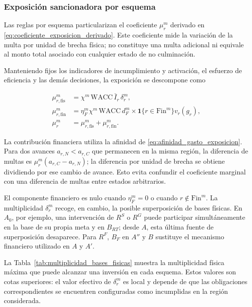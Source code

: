 \subsubsection{Exposición sancionadora por esquema}

Las reglas por esquema particularizan el coeficiente \(\mu_r^m\) derivado en \eqref{eq:coeficiente_exposicion_derivado}. Este coeficiente mide la variación de la multa por unidad de brecha física; no constituye una multa adicional ni equivale al monto total asociado con cualquier estado de no culminación.

Manteniendo fijos los indicadores de incumplimiento y activación, el esfuerzo de eficiencia y las demás decisiones, la exposición se descompone como

\begin{subequations}
\label{eq:descomposicion_exposicion_esquemas}
\begin{align}
\mu_{r,\mathrm{fis}}^m
&=\chi^m\,\mathrm{WACC}\,\bar I_r\,\delta_r^m,
\label{eq:exposicion_fisica_esquemas}\\
\mu_{r,\mathrm{fin}}^m
&=\eta_F^m\chi^m\,\mathrm{WACC}\,d_F^m\times\mathbf1\{r\in\mathrm{Fin}^m\}v_r(g_r),
\label{eq:exposicion_financiera_esquemas}\\
\mu_r^m
&=\mu_{r,\mathrm{fis}}^m+\mu_{r,\mathrm{fin}}^m.
\label{eq:exposicion_total_esquemas}
\end{align}
\end{subequations}

La contribución financiera utiliza la afinidad de \eqref{eq:afinidad_gasto_exposicion}. Para dos avances \(a_{r,N}<a_{r,C}\) que permanecen en la misma región, la diferencia de multas es \(\mu_r^m(a_{r,C}-a_{r,N})\); la diferencia por unidad de brecha se obtiene dividiendo por ese cambio de avance. Esto evita confundir el coeficiente marginal con una diferencia de multas entre estados arbitrarios.

El componente financiero es nulo cuando \(\eta_F^m=0\) o cuando \(r\notin\mathrm{Fin}^m\). La multiplicidad \(\delta_r^m\) recoge, en cambio, la posible superposición de bases físicas. En \(A_0\), por ejemplo, una intervención de \(R^{S}\) o \(R^{G}\) puede participar simultáneamente en la base de su propia meta y en \(B_{RT}\); desde \(A\), esta última fuente de superposición desaparece. Para \(R^{F}\), \(B_F\) en \(A''\) y \(B\) sustituye el mecanismo financiero utilizado en \(A\) y \(A'\).

La Tabla~\ref{tab:multiplicidad_bases_fisicas} muestra la multiplicidad física máxima que puede alcanzar una inversión en cada esquema. Estos valores son cotas superiores: el valor efectivo de \(\delta_r^m\) es local y depende de que las obligaciones correspondientes se encuentren configuradas como incumplidas en la región considerada.

